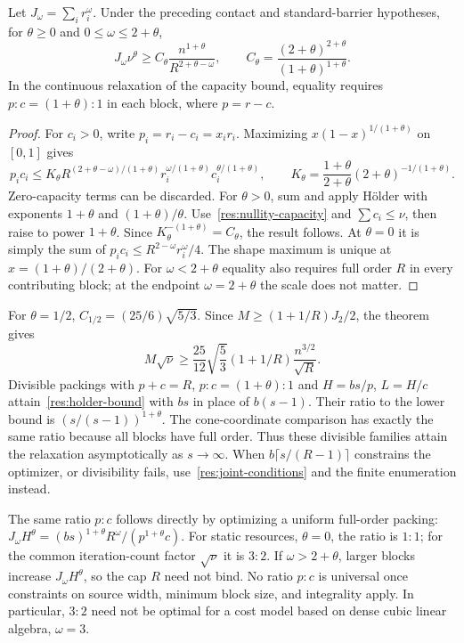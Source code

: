 \begin{theorem}\label{res:holder}
Let $J_\omega=\sum_i r_i^\omega$. Under the preceding contact and
standard-barrier hypotheses, for $\theta\geq0$ and
$0\leq\omega\leq2+\theta$,
\begin{equation}\label{res:holder-bound}
 J_\omega\nu^\theta\geq
 C_\theta\frac{n^{1+\theta}}{R^{2+\theta-\omega}},
 \qquad C_\theta=\frac{(2+\theta)^{2+\theta}}
                         {(1+\theta)^{1+\theta}}.
\end{equation}
In the continuous relaxation of the capacity bound, equality requires
$p:c=(1+\theta):1$ in each block, where $p=r-c$.
\end{theorem}
\begin{proof}
For $c_i>0$, write $p_i=r_i-c_i=x_i r_i$. Maximizing
$x(1-x)^{1/(1+\theta)}$ on $[0,1]$ gives
\[
 p_ic_i\leq K_\theta R^{(2+\theta-\omega)/(1+\theta)}
 r_i^{\omega/(1+\theta)}c_i^{\theta/(1+\theta)},\qquad
 K_\theta=\frac{1+\theta}{2+\theta}
             (2+\theta)^{-1/(1+\theta)}.
\]
Zero-capacity terms can be discarded. For $\theta>0$, sum and apply
H\"older with exponents $1+\theta$ and $(1+\theta)/\theta$.
Use~\eqref{res:nullity-capacity} and $\sum c_i\leq\nu$, then raise to
power $1+\theta$. Since $K_\theta^{-(1+\theta)}=C_\theta$, the result
follows. At $\theta=0$ it is simply the sum of
$p_ic_i\leq R^{2-\omega}r_i^\omega/4$.
The shape maximum is unique at $x=(1+\theta)/(2+\theta)$.
For $\omega<2+\theta$ equality also requires full order $R$ in every
contributing block; at the endpoint $\omega=2+\theta$ the scale does not
matter.
\end{proof}

For $\theta=1/2$,
$C_{1/2}=(25/6)\sqrt{5/3}$. Since
$M\geq(1+1/R)J_2/2$, the theorem gives
\begin{equation}\label{res:coordinate-bound}
 M\sqrt\nu\geq\frac{25}{12}\sqrt{\frac53}
       (1+1/R)\frac{n^{3/2}}{\sqrt R}.
\end{equation}
Divisible packings with $p+c=R$, $p:c=(1+\theta):1$ and
$H=bs/p$, $L=H/c$ attain~\eqref{res:holder-bound} with $bs$ in
place of $b(s-1)$. Their ratio to the lower bound is
$(s/(s-1))^{1+\theta}$. The cone-coordinate comparison has exactly the
same ratio because all blocks have full order. Thus these divisible
families attain the relaxation asymptotically as $s\to\infty$. When
$b\lceil s/(R-1)\rceil$ constrains the optimizer, or divisibility fails,
use~\eqref{res:joint-conditions} and the finite enumeration instead.

The same ratio $p:c$ follows directly by optimizing a uniform
full-order packing: $J_\omega H^\theta=(bs)^{1+\theta}R^\omega/(p^{1+\theta}c)$.
For static resources, $\theta=0$, the ratio is $1:1$; for the common
iteration-count factor $\sqrt\nu$ it is $3:2$. If $\omega>2+\theta$,
larger blocks increase $J_\omega H^\theta$, so the cap $R$ need not bind.
No ratio $p:c$ is universal once constraints on source width, minimum
block size, and integrality apply. In particular, $3:2$ need not be
optimal for a cost model based on dense cubic linear algebra, $\omega=3$.

